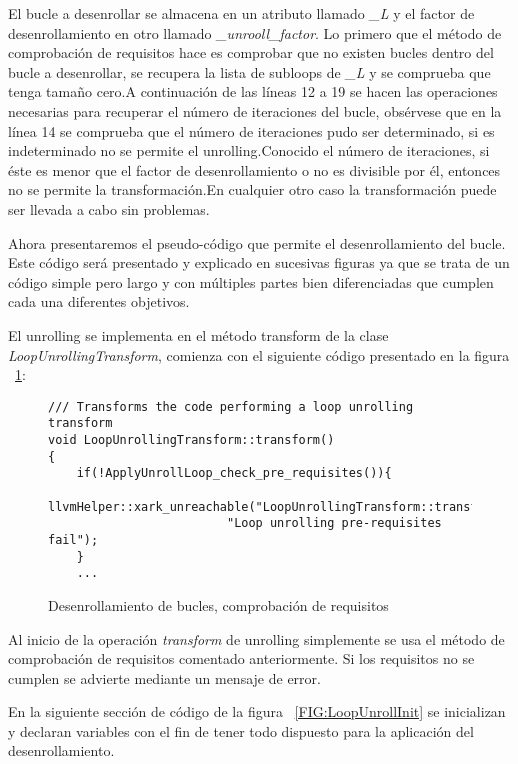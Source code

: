 El bucle a desenrollar se almacena en un atributo llamado \textit{\_L} y el factor de desenrollamiento en otro llamado \textit{\_unrooll\_factor}. Lo primero que el método de comprobación de requisitos hace es comprobar que no existen bucles dentro del bucle a desenrollar, se recupera la lista de subloops de \textit{\_L} y se comprueba que tenga tamaño cero.A continuación de las líneas 12 a 19 se hacen las operaciones necesarias para recuperar el número de iteraciones del bucle, obsérvese que en la línea 14 se comprueba que el número de iteraciones pudo ser determinado, si es indeterminado no se permite el unrolling.Conocido el número de iteraciones, si éste es menor que el factor de desenrollamiento o no es divisible por él, entonces no se permite la transformación.En cualquier otro caso la transformación puede ser llevada a cabo sin problemas.

Ahora presentaremos el pseudo-código que permite el desenrollamiento del bucle. Este código será presentado y explicado en sucesivas figuras ya que se trata de un código simple pero largo y con múltiples partes bien diferenciadas que cumplen cada una diferentes objetivos.

El unrolling se implementa en el método transform de la clase \textit{LoopUnrollingTransform}, comienza con el siguiente código presentado en la figura ~\ref{FIG:LoopUnrollCheck}:

\begin{figure}[t]
\begin{lstlisting}
/// Transforms the code performing a loop unrolling transform
void LoopUnrollingTransform::transform()
{
	if(!ApplyUnrollLoop_check_pre_requisites()){
		llvmHelper::xark_unreachable("LoopUnrollingTransform::transform()"
					     "Loop unrolling pre-requisites fail");
	}
	...
\end{lstlisting}
\caption{Desenrollamiento de bucles, comprobación de requisitos}
\label{FIG:LoopUnrollCheck}
\end{figure}

Al inicio de la operación \textit{transform} de unrolling simplemente se usa el método de comprobación de requisitos comentado anteriormente. Si los requisitos no se cumplen se advierte mediante un mensaje de error.

En la siguiente sección de código de la figura ~\ref{FIG:LoopUnrollInit} se inicializan y declaran variables con el fin de tener todo dispuesto para la aplicación del desenrollamiento.

